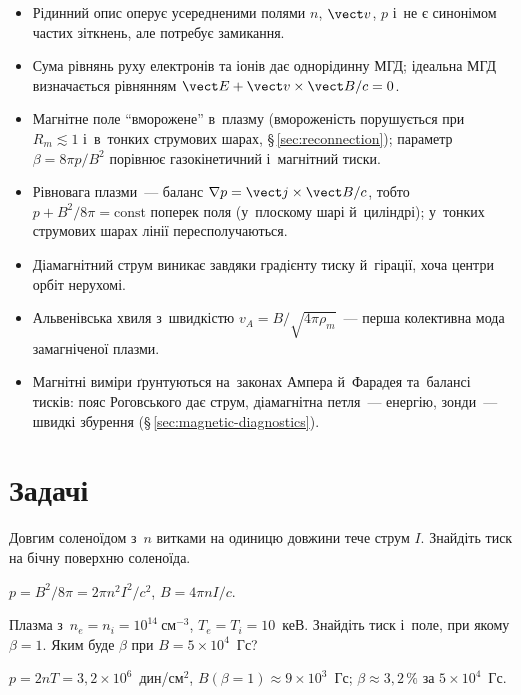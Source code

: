 \begin{Summary}
\begin{itemize}
\item Рідинний опис оперує усередненими полями $n$, $\vect v$, $p$ і~не є синонімом частих зіткнень, але потребує замикання.
\item Сума рівнянь руху електронів та іонів дає однорідинну МГД; ідеальна МГД визначається рівнянням $\vect E+\vect v\times\vect B/c=0$.
\item Магнітне поле \enquote{вморожене} в~плазму (вмороженість порушується при $R_m\lesssim1$ і~в~тонких струмових шарах, §\,\ref{sec:reconnection}); параметр $\beta=8\pi p/B^2$ порівнює газокінетичний і~магнітний тиски.
\item Рівновага плазми~--- баланс $\nabla p=\vect j\times\vect B/c$, тобто $p+B^2/8\pi=\mathrm{const}$ поперек поля (у~плоскому шарі й~циліндрі); у~тонких струмових шарах лінії пересполучаються.
\item Діамагнітний струм виникає завдяки градієнту тиску й~гірації, хоча центри орбіт нерухомі.
\item Альвенівська хвиля з~швидкістю $v_A=B/\sqrt{4\pi\rho_m}$~--- перша колективна мода замагніченої плазми.
\item Магнітні виміри ґрунтуються на~законах Ампера й~Фарадея та~балансі тисків: пояс Роговського дає струм, діамагнітна петля~--- енергію, зонди~--- швидкі збурення (§\,\ref{sec:magnetic-diagnostics}).
\end{itemize}
\end{Summary}

\section*{Задачі}

\begin{problem}\label{prb:SolenoidPressure}
	Довгим соленоїдом з~$n$ витками на одиницю довжини тече струм $I$. Знайдіть тиск на бічну поверхню
	соленоїда.
	\begin{solution}
		$p=B^2/8\pi=2\pi n^2I^2/c^2$, $B=4\pi nI/c$.
	\end{solution}
\end{problem}

\begin{problem}\label{prb:PlasmaBeta}
	Плазма з~$n_e=n_i=10^{14}~\mathrm{см}^{-3}$, $T_e=T_i=10$~кеВ. Знайдіть тиск і~поле,
	при якому $\beta=1$. Яким буде $\beta$ при $B=5\times10^4$~Гс?
	\begin{solution}
		$p=2nT=3{,}2\times10^{6}$~дин/см$^2$, $B(\beta=1)\approx9\times10^{3}$~Гс; $\beta\approx3{,}2\,\%$ за $5\times10^4$~Гс.
	\end{solution}
\end{problem}

